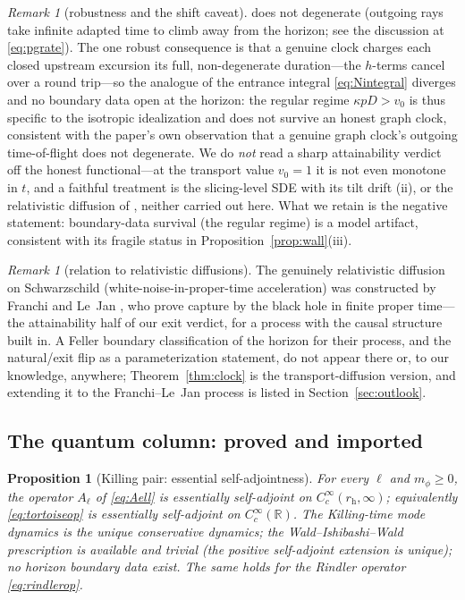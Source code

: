 \documentclass[11pt]{article}
\newtheorem{proposition}[theorem]{Proposition}
\theoremstyle{definition}
\theoremstyle{remark}
\newtheorem{remark}[theorem]{Remark}
\newcommand{\rh}{r_{\mathrm{h}}}
\begin{document}
\begin{remark}[robustness and the shift caveat]
does not degenerate (outgoing rays take infinite adapted time to climb
away from the horizon; see the discussion at \eqref{eq:pgrate}). The
one robust consequence is that a genuine clock charges each closed
upstream excursion its full, non-degenerate duration---the $h$-terms
cancel over a round trip---so the analogue of the entrance integral
\eqref{eq:Nintegral} diverges and no boundary data open at the horizon: the regular regime
$\kappa pD>v_{0}$ is thus specific to the isotropic idealization and
does not survive an honest graph clock, consistent with the paper's own
observation that a genuine graph clock's outgoing time-of-flight does
not degenerate.
We do \emph{not} read a sharp attainability verdict off the honest
functional---at the transport value $v_{0}=1$ it is not even monotone
in $t$, and a faithful treatment is the slicing-level SDE with its tilt
drift (ii), or the relativistic diffusion of \cite{FranchiLeJan2007},
neither carried out here. What we retain is the negative statement:
boundary-data survival (the regular regime) is a model artifact,
consistent with its fragile status in
Proposition~\ref{prop:wall}(iii).
\end{remark}

\begin{remark}[relation to relativistic diffusions]
The genuinely relativistic diffusion on Schwarzschild
(white-noise-in-proper-time acceleration) was constructed by
Franchi and Le~Jan \cite{FranchiLeJan2007}, who prove capture by the
black hole in finite proper time---the attainability half of our exit
verdict, for a process with the causal structure built in. A Feller
boundary classification of the horizon for their process, and the
natural/exit flip as a parameterization statement, do not appear
there or, to our knowledge, anywhere; Theorem~\ref{thm:clock} is the
transport-diffusion version, and extending it to the Franchi--Le~Jan
process is listed in Section~\ref{sec:outlook}.
\end{remark}

\subsection{The quantum column: proved and imported}
\label{subsec:quantum}

\begin{proposition}[Killing pair: essential self-adjointness]
\label{prop:essa}
For every $\ell$ and $m_{\phi}\ge0$, the operator $A_{\ell}$ of
\eqref{eq:Aell} is essentially self-adjoint on
$C_{c}^{\infty}(\rh,\infty)$; equivalently
\eqref{eq:tortoiseop} is essentially self-adjoint on
$C_{c}^{\infty}(\mathbb{R})$. The Killing-time mode dynamics is the
unique conservative dynamics; the Wald--Ishibashi--Wald prescription
\cite{Wald1980,IshibashiWald2003} is available and trivial (the
positive self-adjoint extension is unique); no horizon boundary data
exist. The same holds for the Rindler operator \eqref{eq:rindlerop}.
\end{proposition}
\end{document}
